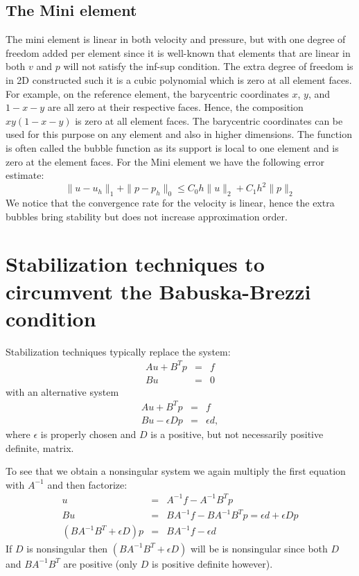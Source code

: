 \subsection{The Mini element}
The mini element is linear in both velocity and pressure, but with one degree of freedom added per element since it is well-known that elements that are linear in both $v$ and $p$ will not satisfy the inf-sup condition. The extra degree of freedom is in 2D constructed such it is a cubic polynomial which is zero at all element faces. 
For example, on the reference element, the barycentric coordinates $x$, $y$, and $1-x-y$ are all zero at their respective faces. Hence, the composition 
$xy(1-x-y)$ is zero at all element faces. 
The barycentric coordinates can be used for this purpose on any element and also in higher dimensions.   
The function is often called the bubble function as its support is local to one element and is zero at the element faces. 
For the Mini element we have the following error estimate:
\[\|u-u_h\|_1 + \|p-p_h\|_0 \leqslant C_0 h\|u\|_{2} + C_1 h^2\|p\|_{2}\]
We notice that the convergence rate for the velocity is linear, hence the extra bubbles bring stability but does not increase approximation
order. 

\section{Stabilization techniques to circumvent the Babuska-Brezzi condition}
Stabilization techniques typically replace the system:
\begin{eqnarray*}
Au + B^Tp &=& f \\
Bu &=& 0
\end{eqnarray*}
with an alternative system
\begin{eqnarray*}
Au + B^Tp &=& f \\
Bu -\epsilon Dp &=& \epsilon d ,
\end{eqnarray*}
where $\epsilon$ is properly chosen and $D$ is a positive, but not necessarily positive definite,  matrix.

To see that we obtain a nonsingular system we again multiply the first
equation with $A^{-1}$ and then factorize:
\begin{eqnarray*}
u &=& A^{-1}f - A^{-1}B^Tp \\
Bu &=& BA^{-1}f - BA^{-1}B^Tp  = \epsilon d + \epsilon Dp \\
(BA^{-1}B^T + \epsilon D)p &=& BA^{-1}f - \epsilon d
\end{eqnarray*}
If $D$ is nonsingular then
$(BA^{-1}B^T + \epsilon D)$ will be is nonsingular since both $D$ and $BA^{-1}B^T$ are positive (only $D$ is positive definite however).

